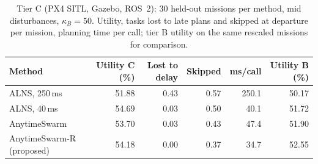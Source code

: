 \begin{table}[t]
\caption{Tier C (PX4 SITL, Gazebo, ROS~2): 30 held-out missions per method, mid disturbances, $\kappa_B=50$. Utility, tasks lost to late plans and skipped at departure per mission, planning time per call; tier B utility on the same rescaled missions for comparison.}\label{tab:tierc}
\centering\small
\begin{tabular}{lrrrrr}
\toprule
Method & Utility C (\%) & Lost to delay & Skipped & ms/call & Utility B (\%) \\
\midrule
ALNS, 250\,ms & 51.88 & 0.43 & 0.57 & 250.1 & 50.17 \\
ALNS, 40\,ms & 54.69 & 0.03 & 0.50 & 40.1 & 51.72 \\
AnytimeSwarm & 53.70 & 0.03 & 0.43 & 47.4 & 51.90 \\
AnytimeSwarm-R (proposed) & 54.18 & 0.00 & 0.37 & 34.7 & 52.55 \\
\bottomrule
\end{tabular}
\end{table}
